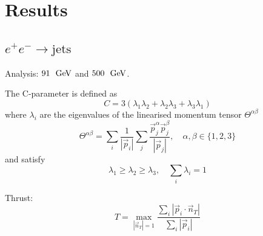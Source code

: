 \section{Results}
\label{sec:psunc:results}

\subsection{$e^+e^-\to\text{jets}$}
\label{sec:psunc:results:ee}
Analysis: $91~~\textrm{GeV}$ and $500~~\textrm{GeV}$.

The C-parameter is defined as
\begin{equation}
  C = 3(\lambda_1\lambda_2 +\lambda_2\lambda_3 +\lambda_3\lambda_1)
  \label{eqn:cparam}
\end{equation}
where $\lambda_i$ are the eigenvalues of the linearised momentum tensor $\Theta^{\alpha\beta}$
\begin{equation}
  \Theta^{\alpha\beta} = \sum_i \frac{1}{|\vec{p}_i|} \sum_j \frac{\vec{p}^\alpha_j\vec{p}^\beta_j}{|\vec{p}_j|},\quad \alpha,\beta \in \{1,2,3\}
  \label{eqn:linearized_momentum_tensor}
\end{equation}
and satisfy
\begin{equation}
  \lambda_1\geq\lambda_2\geq\lambda_3,\quad\sum_i \lambda_i = 1
\end{equation}

Thrust:
\begin{equation}
  T = \max_{|\vec{n}_T|=1} \frac{\sum_i |\vec{p}_i\cdot \vec{n}_T|}{\sum_i |\vec{p}_i|}
  \label{eqn:thrust}
\end{equation}

